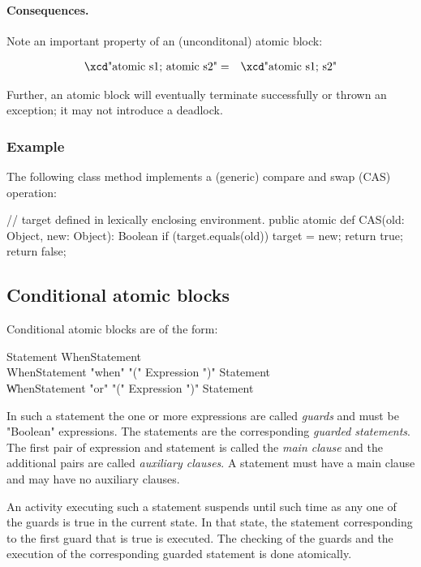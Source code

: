 {\paragraph{Consequences.}
Note an important property of an (unconditonal) atomic block:

\begin{eqnarray}
 \mbox{\xcd"atomic {s1; atomic s2}"} &=& \mbox{\xcd"atomic {s1; s2}"}
\end{eqnarray}

Further, an atomic block will eventually terminate successfully or
thrown an exception; it may not introduce a deadlock.


\subsubsection{Example}

The following class method implements a (generic) compare and swap (CAS) operation:

\begin{xten}
// target defined in lexically enclosing environment.
public atomic def CAS(old: Object, new: Object): Boolean {
   if (target.equals(old)) {
     target = new;
     return true;
   }
   return false;
}
\end{xten}

\subsection{Conditional atomic blocks}

Conditional atomic blocks are of the form:

\begin{grammar}
Statement \:  WhenStatement \\
WhenStatement \:  \xcd"when" \xcd"(" Expression \xcd")" Statement \\
            \| WhenStatement \xcd"or" \xcd"(" Expression \xcd")" Statement \\
\end{grammar}

In such a statement the one or more expressions are called {\em
guards} and must be \xcd"Boolean" expressions. The statements are the
corresponding {\em guarded statements}. The first pair of expression
and statement is called the {\em main clause} and the additional pairs
are called {\em auxiliary clauses}. A statement must have a main
clause and may have no auxiliary clauses.

An activity executing such a statement suspends until such time as any
one of the guards is true in the current state. In that state, the
statement corresponding to the first guard that is true is executed.
The checking of the guards and the execution of the corresponding
guarded statement is done atomically. 


}

